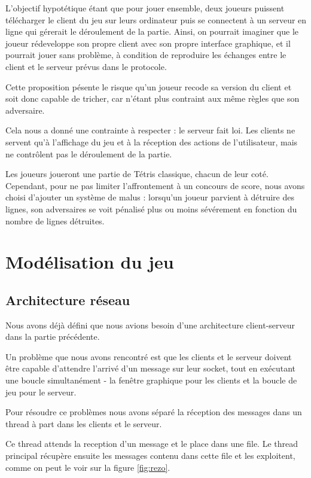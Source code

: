 \documentclass[a4paper, 12pt]{article}
\begin{document}
		L'objectif hypotétique étant que pour jouer ensemble, deux joueurs puissent télécharger le client du jeu sur leurs ordinateur puis se connectent à un serveur en ligne qui gérerait le déroulement de la partie. 
		Ainsi, on pourrait imaginer que le joueur rédeveloppe son propre client avec son propre interface graphique, et il pourrait jouer sans problème, à condition de reproduire les échanges entre le client et le serveur prévus dans le protocole.

		Cette proposition pésente le risque qu'un joueur recode sa version du client et soit donc capable de tricher, car n'étant plus contraint aux même règles que son adversaire.

		Cela nous a donné une contrainte à respecter : le serveur fait loi. Les clients ne servent qu'à l'affichage du jeu et à la réception des actions de l'utilisateur, mais ne contrôlent pas le déroulement de la partie.

		Les joueurs joueront une partie de Tétris classique, chacun de leur coté. Cependant, pour ne pas limiter l'affrontement à un concours de score, nous avons choisi d'ajouter un système de malus : lorsqu'un joueur parvient à détruire des lignes, son adversaires se voit pénalisé plus ou moins sévérement en fonction du nombre de lignes détruites.

	\section{Modélisation du jeu}

		\subsection{Architecture réseau}

			Nous avons déjà défini que nous avions besoin d'une architecture client-serveur dans la partie précédente.

			Un problème que nous avons rencontré est que les clients et le serveur doivent être capable d'attendre l'arrivé d'un message sur leur socket, tout en exécutant une boucle simultanément - la fenêtre graphique pour les clients et la boucle de jeu pour le serveur.


			Pour résoudre ce problèmes nous avons séparé la réception des messages dans un thread à part dans les clients et le serveur.

			Ce thread attends la reception d'un message et le place dans une file. Le thread principal récupère ensuite les messages contenu dans cette file et les exploitent, comme on peut le voir sur la figure \ref{fig:rezo}.
\end{document}
